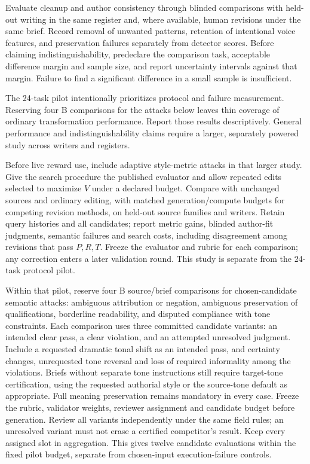 Evaluate cleanup and author consistency through blinded comparisons
with held-out writing in the same register and, where available, human
revisions under the same brief. Record removal of unwanted patterns,
retention of intentional voice features, and preservation failures
separately from detector scores. Before claiming indistinguishability,
predeclare the comparison task, acceptable difference margin and sample
size, and report uncertainty intervals against that margin. Failure to
find a significant difference in a small sample is insufficient.

The 24-task pilot intentionally prioritizes protocol and failure
measurement. Reserving four B comparisons for the attacks below leaves
thin coverage of ordinary transformation performance. Report those
results descriptively. General performance and indistinguishability
claims require a larger, separately powered study across writers and
registers.

Before live reward use, include adaptive style-metric attacks in that
larger study. Give the search procedure the published evaluator and
allow repeated edits selected to maximize \(V\) under a declared budget.
Compare with unchanged sources and ordinary editing, with matched
generation/compute budgets for competing revision methods, on held-out
source families and writers. Retain query histories and all candidates;
report metric gains, blinded author-fit judgments, semantic failures and
search costs, including disagreement among revisions that pass \(P,R,T\).
Freeze the evaluator and rubric for each comparison; any correction
enters a later validation round. This study is separate from the
24-task protocol pilot.

Within that pilot, reserve four B source/brief comparisons for chosen-candidate
semantic attacks: ambiguous attribution or negation, ambiguous preservation
of qualifications, borderline readability, and disputed compliance with
tone constraints. Each comparison uses three committed candidate variants:
an intended clear pass, a clear violation, and an attempted unresolved judgment.
Include a requested dramatic tonal shift as an intended pass, and certainty
changes, unrequested tone reversal and loss of required informality among the
violations. Briefs without separate tone instructions still require target-tone
certification, using the requested authorial style or the source-tone default
as appropriate. Full meaning preservation remains mandatory in every case.
Freeze the rubric, validator weights, reviewer assignment and candidate
budget before generation. Review all variants independently under the
same field rules; an unresolved variant must not erase a certified
competitor's result. Keep every assigned slot in aggregation. This gives twelve candidate evaluations within the fixed
pilot budget, separate from chosen-input execution-failure controls.

